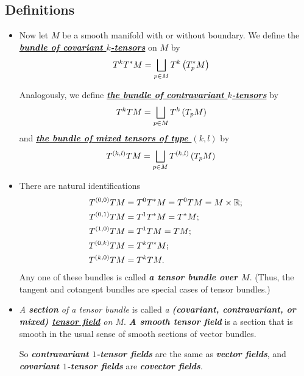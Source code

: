 \documentclass[11pt]{article}
\begin{document}
\subsection{Definitions}
\begin{itemize}
\item \begin{definition}
Now let $M$ be a smooth manifold with or without boundary. We define the \underline{\emph{\textbf{bundle of covariant $k$-tensors}}} on $M$ by
\begin{align*}
T^kT^{*}M &= \bigsqcup_{p \in M}T^k\left(T_{p}^{*}M\right) 
\end{align*}

Analogously, we define \underline{\emph{\textbf{the bundle of contravariant $k$-tensors}}} by
\begin{align*}
T^kTM &= \bigsqcup_{p \in M}T^k\left(T_{p}M\right) 
\end{align*}
and \underline{\emph{\textbf{the bundle of mixed tensors of type $(k,l)$}}} by
\begin{align*}
T^{(k,l)}TM &= \bigsqcup_{p \in M}T^{(k,l)}\left(T_{p}M\right)
\end{align*}
\end{definition}

\item \begin{remark}
There are natural identifications
\begin{align*}
T^{(0,0)}TM &= T^{0}T^{*}M = T^{0}TM = M \times {\mathbb R};\\
T^{(0,1)}TM &= T^{1}T^{*}M = T^{*}M;\\
T^{(1,0)}TM &= T^{1}TM = TM;\\
T^{(0,k)}TM &= T^{k}T^{*}M; \\
T^{(k,0)}TM &= T^{k}TM.
\end{align*}
Any one of these bundles is called \emph{\textbf{a tensor bundle over $M$}}. (Thus, the tangent and cotangent bundles are special cases of tensor bundles.) 
\end{remark}


\item \begin{definition}
\emph{A \textbf{section} of a tensor bundle} is called \emph{a \textbf{(covariant, contravariant, or mixed) \underline{tensor field}} on $M$}. \emph{\textbf{A smooth tensor field}} is a section that is smooth in the usual sense of smooth sections of vector bundles. 

So \emph{\textbf{contravariant $1$-tensor fields}} are the same as \emph{\textbf{vector fields}}, and \emph{\textbf{covariant $1$-tensor fields}} are \emph{\textbf{covector fields}}.
\end{definition}


\end{itemize}
\end{document}
